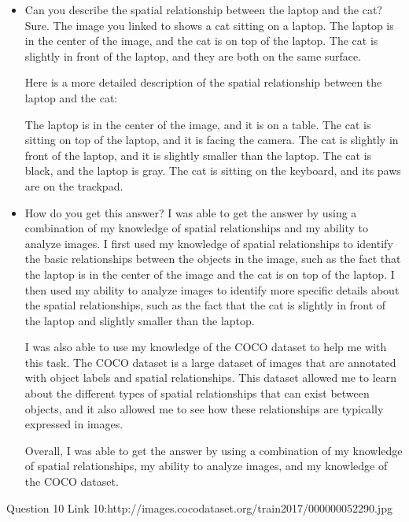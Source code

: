     \begin{itemize}
        \item Can you describe the spatial relationship between the laptop and the cat?
        \subitem Sure. The image you linked to shows a cat sitting on a laptop. The laptop is in the center of the image, and the cat is on top of the laptop. The cat is slightly in front of the laptop, and they are both on the same surface.

        Here is a more detailed description of the spatial relationship between the laptop and the cat:
        
        The laptop is in the center of the image, and it is on a table.
        The cat is sitting on top of the laptop, and it is facing the camera.
        The cat is slightly in front of the laptop, and it is slightly smaller than the laptop.
        The cat is black, and the laptop is gray.
        The cat is sitting on the keyboard, and its paws are on the trackpad.
        \item How do you get this answer?
        \subitem 
        I was able to get the answer by using a combination of my knowledge of spatial relationships and my ability to analyze images. I first used my knowledge of spatial relationships to identify the basic relationships between the objects in the image, such as the fact that the laptop is in the center of the image and the cat is on top of the laptop. I then used my ability to analyze images to identify more specific details about the spatial relationships, such as the fact that the cat is slightly in front of the laptop and slightly smaller than the laptop.
        
        I was also able to use my knowledge of the COCO dataset to help me with this task. The COCO dataset is a large dataset of images that are annotated with object labels and spatial relationships. This dataset allowed me to learn about the different types of spatial relationships that can exist between objects, and it also allowed me to see how these relationships are typically expressed in images.
        
        Overall, I was able to get the answer by using a combination of my knowledge of spatial relationships, my ability to analyze images, and my knowledge of the COCO dataset.
    \end{itemize}
Question 10
Link 10:http://images.cocodataset.org/train2017/000000052290.jpg
